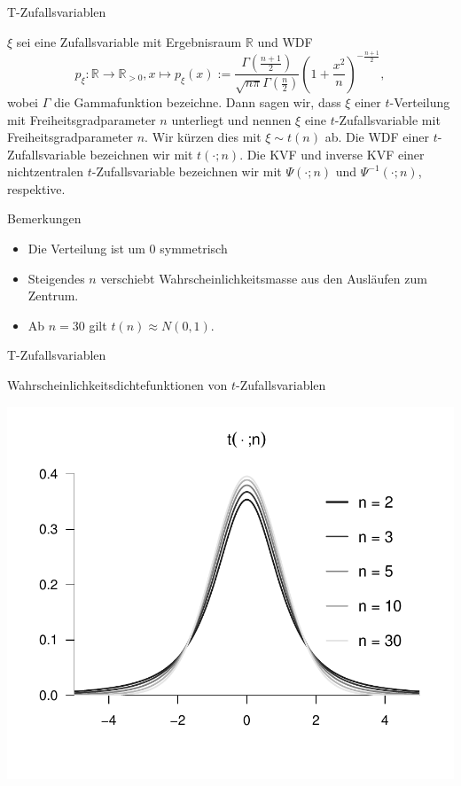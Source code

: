 \documentclass[
  8pt,
  ignorenonframetext,
]{beamer}
\providecommand{\tightlist}{%
  \setlength{\itemsep}{0pt}\setlength{\parskip}{0pt}}
\begin{document}
\begin{frame}{T-Zufallsvariablen}
\protect\hypertarget{t-zufallsvariablen}{}
\footnotesize
\begin{definition}[$t$-Zufallsvariable]
\justifying
$\xi$ sei eine Zufallsvariable mit Ergebnisraum $\mathbb{R}$ und WDF
\begin{equation}
p_\xi : \mathbb{R} \to \mathbb{R}_{>0}, x \mapsto p_\xi(x)
:= \frac{\Gamma\left(\frac{n+1}{2}\right)}{\sqrt{n\pi}\Gamma\left(\frac{n}{2}\right)}
\left(1 + \frac{x^2}{n} \right)^{-\frac{n+1}{2}},
\end{equation}
wobei $\Gamma$ die Gammafunktion bezeichne. Dann sagen wir, dass $\xi$ einer
$t$-Verteilung mit Freiheitsgradparameter $n$ unterliegt und nennen $\xi$ eine $t$-Zufallsvariable
mit Freiheitsgradparameter $n$. Wir kürzen dies mit $\xi \sim t(n)$ ab. Die WDF einer
$t$-Zufallsvariable bezeichnen wir mit $t(\cdot ;n)$. Die KVF und inverse KVF einer 
nichtzentralen $t$-Zufallsvariable bezeichnen wir mit $\Psi(\cdot;n)$ 
und $\Psi^{-1}(\cdot;n)$, respektive.
\end{definition}

Bemerkungen

\begin{itemize}
\tightlist
\item
  Die Verteilung ist um 0 symmetrisch
\item
  Steigendes \(n\) verschiebt Wahrscheinlichkeitsmasse aus den Ausläufen
  zum Zentrum.
\item
  Ab \(n = 30\) gilt \(t(n) \approx N(0,1)\).
\end{itemize}
\end{frame}

\begin{frame}{T-Zufallsvariablen}
\protect\hypertarget{t-zufallsvariablen-1}{}
\vfill

Wahrscheinlichkeitsdichtefunktionen von \(t\)-Zufallsvariablen
\vspace{5mm}

\begin{center}\includegraphics[width=0.7\linewidth]{7_Abbildungen/alm_7_t_wdf} \end{center}
\vspace{-3mm}
\footnotesize
\end{frame}
\end{document}
